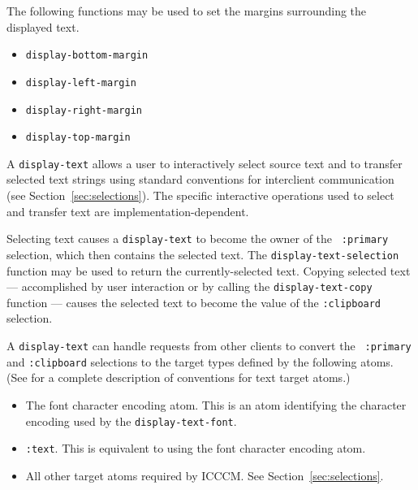 The following functions may be used to set the margins surrounding the displayed
text.

\begin{itemize}
 \item {\tt display-bottom-margin}
 \item {\tt display-left-margin}
 \item {\tt display-right-margin}
 \item {\tt display-top-margin}
\end{itemize}




  
A {\tt display-text} allows a user to interactively select source text and to transfer
selected text strings using standard conventions for interclient communication
(see Section~\ref{sec:selections}).  The specific interactive operations used to
select and transfer text are implementation-dependent.

Selecting text causes a {\tt display-text} to become the owner of the {\tt
:primary} selection, which then contains the selected text. 
The {\tt display-text-selection} function may be used to return the
currently-selected text.
Copying selected text --- accomplished by user interaction or by
calling the {\tt display-text-copy} function --- causes the selected text to
become the value of the {\tt :clipboard} selection.

A {\tt display-text} can handle requests from other clients to convert the {\tt
:primary} and {\tt :clipboard} selections to the target types defined by the
following atoms. (See \cite{icccm}
for a complete description of conventions for text target atoms.)

\begin{itemize}
\item The font character encoding atom. This is an atom identifying the character
encoding used by the {\tt display-text-font}. 
\item {\tt :text}. This is equivalent to using the font character encoding
atom. 
\item All other target atoms required by ICCCM. See Section~\ref{sec:selections}.
\end{itemize}



